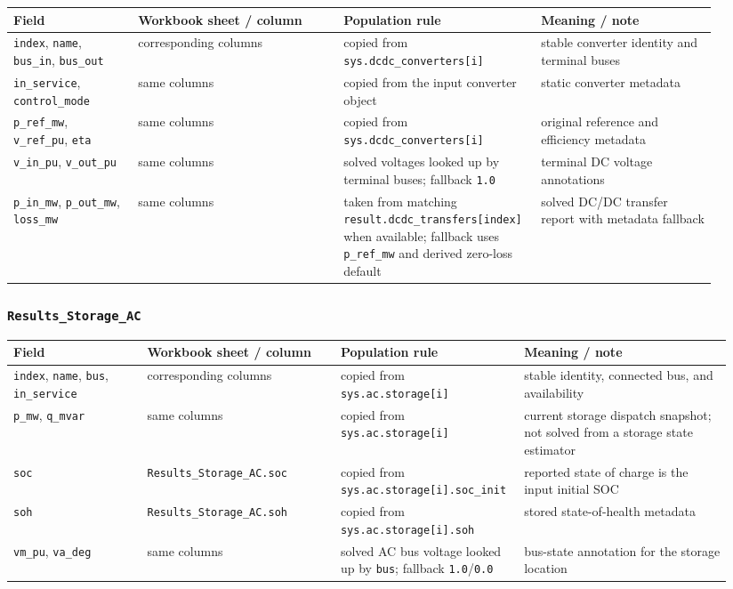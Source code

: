 \begin{longtable}{@{}L{0.17\linewidth}L{0.29\linewidth}L{0.22\linewidth}L{0.24\linewidth}@{}}
\toprule
Field & Workbook sheet / column & Population rule & Meaning / note \\
\midrule
\endhead
\texttt{index}, \texttt{name}, \texttt{bus\_in}, \texttt{bus\_out} & corresponding columns & copied from \texttt{sys.dcdc\_converters[i]} & stable converter identity and terminal buses \\
\texttt{in\_service}, \texttt{control\_mode} & same columns & copied from the input converter object & static converter metadata \\
\texttt{p\_ref\_mw}, \texttt{v\_ref\_pu}, \texttt{eta} & same columns & copied from \texttt{sys.dcdc\_converters[i]} & original reference and efficiency metadata \\
\texttt{v\_in\_pu}, \texttt{v\_out\_pu} & same columns & solved voltages looked up by terminal buses; fallback \texttt{1.0} & terminal DC voltage annotations \\
\texttt{p\_in\_mw}, \texttt{p\_out\_mw}, \texttt{loss\_mw} & same columns & taken from matching \texttt{result.dcdc\_transfers[index]} when available; fallback uses \texttt{p\_ref\_mw} and derived zero-loss default & solved DC/DC transfer report with metadata fallback \\
\bottomrule
\end{longtable}

\subsubsection*{\texttt{Results\_Storage\_AC}}

\begin{longtable}{@{}L{0.18\linewidth}L{0.26\linewidth}L{0.22\linewidth}L{0.28\linewidth}@{}}
\toprule
Field & Workbook sheet / column & Population rule & Meaning / note \\
\midrule
\endhead
\texttt{index}, \texttt{name}, \texttt{bus}, \texttt{in\_service} & corresponding columns & copied from \texttt{sys.ac.storage[i]} & stable identity, connected bus, and availability \\
\texttt{p\_mw}, \texttt{q\_mvar} & same columns & copied from \texttt{sys.ac.storage[i]} & current storage dispatch snapshot; not solved from a storage state estimator \\
\texttt{soc} & \texttt{Results\_Storage\_AC.soc} & copied from \texttt{sys.ac.storage[i].soc\_init} & reported state of charge is the input initial SOC \\
\texttt{soh} & \texttt{Results\_Storage\_AC.soh} & copied from \texttt{sys.ac.storage[i].soh} & stored state-of-health metadata \\
\texttt{vm\_pu}, \texttt{va\_deg} & same columns & solved AC bus voltage looked up by \texttt{bus}; fallback \texttt{1.0}/\texttt{0.0} & bus-state annotation for the storage location \\
\bottomrule
\end{longtable}

